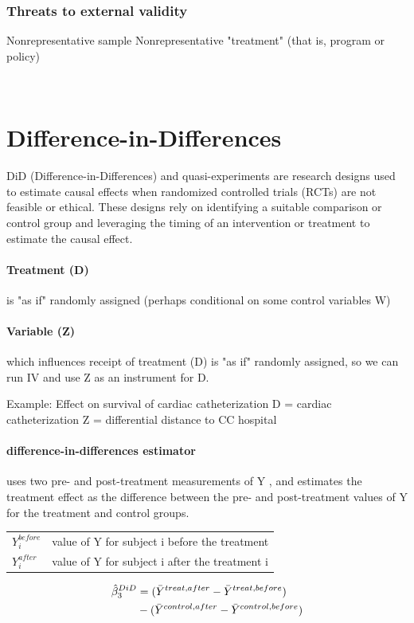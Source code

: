 \documentclass[a3paper, 8pt]{extarticle}
\begin{document}
\begin{multicols*}{5}
\subsubsection{Threats to external validity}
Nonrepresentative sample
Nonrepresentative "treatment" (that is, program or policy)

\


\section{Difference-in-Differences}
DiD (Difference-in-Differences) and quasi-experiments are research designs used to estimate causal effects when randomized controlled trials (RCTs) are not feasible or ethical. These designs rely on identifying a suitable comparison or control group and leveraging the timing of an intervention or treatment to estimate the causal effect.


\paragraph{Treatment (D)} is "as if" randomly assigned (perhaps conditional on some control variables W)

\paragraph{Variable (Z)} which influences receipt of treatment (D) is "as if" randomly assigned, so we can run IV and use Z as an instrument for D.

Example: Effect on survival of cardiac catheterization D = cardiac catheterization
Z = differential distance to CC hospital

\paragraph{difference-in-differences estimator} uses two pre- and post-treatment measurements of Y , and estimates the treatment effect as the difference between the pre- and post-treatment values of Y for the treatment and control groups.

\begin{tabular}{l l}
  $Y_i^{before}$   & value of Y for subject i before the treatment \\
   $Y_i^{after}$  & value of Y for subject i after the treatment i
\end{tabular}

\begin{align*}
    \hat{\beta}_3^{DiD}&=(\Bar{Y}^{treat, after} -\Bar{Y}^{treat, before})\\ &- (\Bar{Y}^{control, after}-\Bar{Y}^{control, before})
\end{align*}


\end{multicols*}
\end{document}
